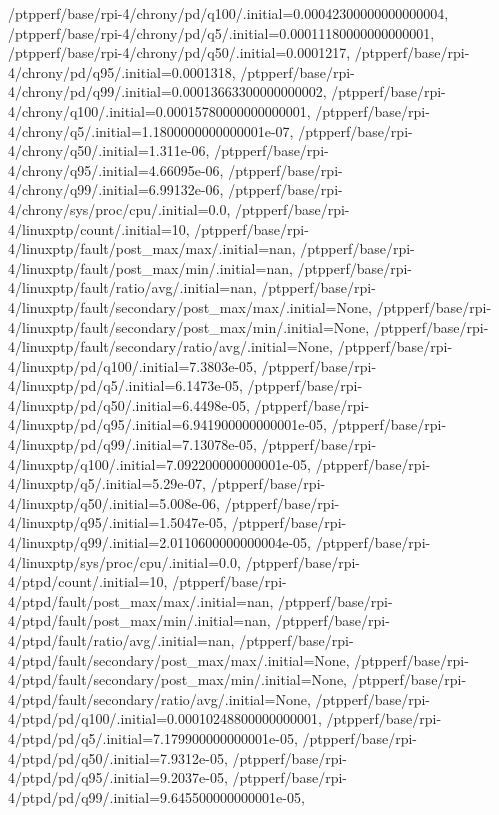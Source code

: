 {    /ptpperf/base/rpi-4/chrony/pd/q100/.initial=0.00042300000000000004,
    /ptpperf/base/rpi-4/chrony/pd/q5/.initial=0.00011180000000000001,
    /ptpperf/base/rpi-4/chrony/pd/q50/.initial=0.0001217,
    /ptpperf/base/rpi-4/chrony/pd/q95/.initial=0.0001318,
    /ptpperf/base/rpi-4/chrony/pd/q99/.initial=0.00013663300000000002,
    /ptpperf/base/rpi-4/chrony/q100/.initial=0.00015780000000000001,
    /ptpperf/base/rpi-4/chrony/q5/.initial=1.1800000000000001e-07,
    /ptpperf/base/rpi-4/chrony/q50/.initial=1.311e-06,
    /ptpperf/base/rpi-4/chrony/q95/.initial=4.66095e-06,
    /ptpperf/base/rpi-4/chrony/q99/.initial=6.99132e-06,
    /ptpperf/base/rpi-4/chrony/sys/proc/cpu/.initial=0.0,
    /ptpperf/base/rpi-4/linuxptp/count/.initial=10,
    /ptpperf/base/rpi-4/linuxptp/fault/post_max/max/.initial=nan,
    /ptpperf/base/rpi-4/linuxptp/fault/post_max/min/.initial=nan,
    /ptpperf/base/rpi-4/linuxptp/fault/ratio/avg/.initial=nan,
    /ptpperf/base/rpi-4/linuxptp/fault/secondary/post_max/max/.initial=None,
    /ptpperf/base/rpi-4/linuxptp/fault/secondary/post_max/min/.initial=None,
    /ptpperf/base/rpi-4/linuxptp/fault/secondary/ratio/avg/.initial=None,
    /ptpperf/base/rpi-4/linuxptp/pd/q100/.initial=7.3803e-05,
    /ptpperf/base/rpi-4/linuxptp/pd/q5/.initial=6.1473e-05,
    /ptpperf/base/rpi-4/linuxptp/pd/q50/.initial=6.4498e-05,
    /ptpperf/base/rpi-4/linuxptp/pd/q95/.initial=6.941900000000001e-05,
    /ptpperf/base/rpi-4/linuxptp/pd/q99/.initial=7.13078e-05,
    /ptpperf/base/rpi-4/linuxptp/q100/.initial=7.092200000000001e-05,
    /ptpperf/base/rpi-4/linuxptp/q5/.initial=5.29e-07,
    /ptpperf/base/rpi-4/linuxptp/q50/.initial=5.008e-06,
    /ptpperf/base/rpi-4/linuxptp/q95/.initial=1.5047e-05,
    /ptpperf/base/rpi-4/linuxptp/q99/.initial=2.0110600000000004e-05,
    /ptpperf/base/rpi-4/linuxptp/sys/proc/cpu/.initial=0.0,
    /ptpperf/base/rpi-4/ptpd/count/.initial=10,
    /ptpperf/base/rpi-4/ptpd/fault/post_max/max/.initial=nan,
    /ptpperf/base/rpi-4/ptpd/fault/post_max/min/.initial=nan,
    /ptpperf/base/rpi-4/ptpd/fault/ratio/avg/.initial=nan,
    /ptpperf/base/rpi-4/ptpd/fault/secondary/post_max/max/.initial=None,
    /ptpperf/base/rpi-4/ptpd/fault/secondary/post_max/min/.initial=None,
    /ptpperf/base/rpi-4/ptpd/fault/secondary/ratio/avg/.initial=None,
    /ptpperf/base/rpi-4/ptpd/pd/q100/.initial=0.00010248800000000001,
    /ptpperf/base/rpi-4/ptpd/pd/q5/.initial=7.179900000000001e-05,
    /ptpperf/base/rpi-4/ptpd/pd/q50/.initial=7.9312e-05,
    /ptpperf/base/rpi-4/ptpd/pd/q95/.initial=9.2037e-05,
    /ptpperf/base/rpi-4/ptpd/pd/q99/.initial=9.645500000000001e-05,
}

